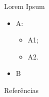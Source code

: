 \documentclass[10pt]{beamer}
\begin{document}
\begin{frame}{Lorem Ipsum}
    \begin{itemize}
        \item<1 -> A:
        \begin{itemize}
            \item<2 -> A1;
            \item<2 -> A2.
        \end{itemize}
        \item<3 -> B
      \end{itemize}
\end{frame}

\begin{frame}[allowframebreaks]{Referências}

  
  

\end{frame}
\end{document}
